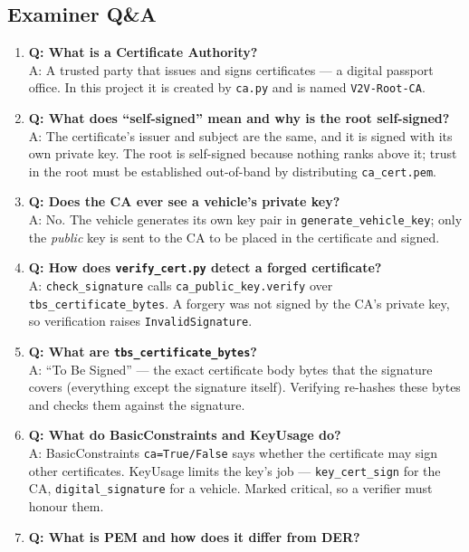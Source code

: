 \documentclass[11pt,a4paper]{article}
\begin{document}
\subsection{Examiner Q\&A}
\begin{enumerate}
  \item \textbf{Q: What is a Certificate Authority?}\\
        A: A trusted party that issues and signs certificates --- a digital
        passport office. In this project it is created by \texttt{ca.py} and is
        named \texttt{V2V-Root-CA}.
  \item \textbf{Q: What does ``self-signed'' mean and why is the root self-signed?}\\
        A: The certificate's issuer and subject are the same, and it is signed
        with its own private key. The root is self-signed because nothing ranks
        above it; trust in the root must be established out-of-band by
        distributing \texttt{ca\_cert.pem}.
  \item \textbf{Q: Does the CA ever see a vehicle's private key?}\\
        A: No. The vehicle generates its own key pair in
        \texttt{generate\_vehicle\_key}; only the \emph{public} key is sent to
        the CA to be placed in the certificate and signed.
  \item \textbf{Q: How does \texttt{verify\_cert.py} detect a forged certificate?}\\
        A: \texttt{check\_signature} calls \texttt{ca\_public\_key.verify} over
        \texttt{tbs\_certificate\_bytes}. A forgery was not signed by the CA's
        private key, so verification raises \texttt{InvalidSignature}.
  \item \textbf{Q: What are \texttt{tbs\_certificate\_bytes}?}\\
        A: ``To Be Signed'' --- the exact certificate body bytes that the
        signature covers (everything except the signature itself). Verifying
        re-hashes these bytes and checks them against the signature.
  \item \textbf{Q: What do BasicConstraints and KeyUsage do?}\\
        A: BasicConstraints \texttt{ca=True/False} says whether the certificate
        may sign other certificates. KeyUsage limits the key's job ---
        \texttt{key\_cert\_sign} for the CA, \texttt{digital\_signature} for a
        vehicle. Marked critical, so a verifier must honour them.
  \item \textbf{Q: What is PEM and how does it differ from DER?}\\

\end{enumerate}
\end{document}
